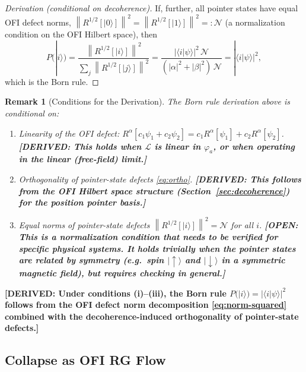 \documentclass[12pt]{article}
\newtheorem{remark}[theorem]{Remark}
\theoremstyle{definition}
\newcommand{\norm}[1]{\left\|#1\right\|}
\newcommand{\DERIVED}[1]{\textcolor{derivedcolor}{\textbf{[DERIVED: #1]}}}
\newcommand{\OPEN}[1]{\textcolor{opencolor}{\textbf{[OPEN: #1]}}}
\begin{document}
\begin{proof}[Derivation (conditional on decoherence)]
If, further, all pointer states have equal OFI defect norms,
$\norm{R^{1/2}[|0\rangle]}^2 = \norm{R^{1/2}[|1\rangle]}^2 =: \mathcal{N}$
(a normalization condition on the OFI Hilbert space), then
\begin{equation}
  P(|i\rangle)
  = \frac{\norm{R^{1/2}[|i\rangle]}^2}
         {\sum_j \norm{R^{1/2}[|j\rangle]}^2}
  = \frac{|\langle i|\psi\rangle|^2\,\mathcal{N}}{(|\alpha|^2+|\beta|^2)\,\mathcal{N}}
  = |\langle i|\psi\rangle|^2,
\end{equation}
which is the Born rule.
\end{proof}

\begin{remark}[Conditions for the Derivation]
The Born rule derivation above is conditional on:
\begin{enumerate}[label=(\roman*),leftmargin=2em]
\item \emph{Linearity} of the OFI defect: $R^\alpha[c_1\psi_1+c_2\psi_2]
  = c_1 R^\alpha[\psi_1] + c_2 R^\alpha[\psi_2]$.
  \DERIVED{This holds when $\mathcal{L}$ is linear in $\varphi_a$,
  or when operating in the linear (free-field) limit.}
\item \emph{Orthogonality of pointer-state defects}
  \eqref{eq:ortho}.
  \DERIVED{This follows from the OFI Hilbert space structure
  (Section~\ref{sec:decoherence}) for the position pointer basis.}
\item \emph{Equal norms of pointer-state defects}
  $\norm{R^{1/2}[|i\rangle]}^2 = \mathcal{N}$ for all $i$.
  \OPEN{This is a normalization condition that needs to be
  verified for specific physical systems.  It holds trivially
  when the pointer states are related by symmetry (e.g.\ spin
  $|\uparrow\rangle$ and $|\downarrow\rangle$ in a symmetric
  magnetic field), but requires checking in general.}
\end{enumerate}
\end{remark}

\DERIVED{Under conditions (i)--(iii), the Born rule $P(|i\rangle) = |\langle i|\psi\rangle|^2$
follows from the OFI defect norm decomposition \eqref{eq:norm-squared}
combined with the decoherence-induced orthogonality of pointer-state defects.}

\subsection{Collapse as OFI RG Flow}
\end{document}
